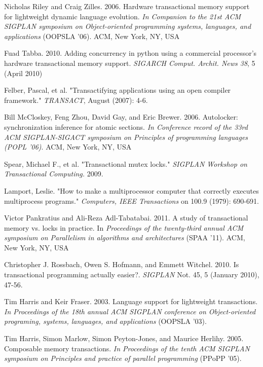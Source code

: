 \documentclass{sigplanconf}
\begin{document}
\begin{thebibliography}{}
  Nicholas Riley and Craig Zilles. 2006. Hardware transactional memory
  support for lightweight dynamic language evolution. \emph{In
    Companion to the 21st ACM SIGPLAN symposium on Object-oriented
    programming systems, languages, and applications} (OOPSLA
  '06). ACM, New York, NY, USA

  Fuad Tabba. 2010. Adding concurrency in python using a commercial
  processor's hardware transactional memory support. \emph{SIGARCH
  Comput. Archit. News 38}, 5 (April 2010)

  Felber, Pascal, et al. "Transactifying applications using an open
  compiler framework." \emph{TRANSACT}, August (2007): 4-6.

  Bill McCloskey, Feng Zhou, David Gay, and Eric
  Brewer. 2006. Autolocker: synchronization inference for atomic
  sections. \emph{In Conference record of the 33rd ACM SIGPLAN-SIGACT
  symposium on Principles of programming languages (POPL '06)}. ACM,
  New York, NY, USA

  Spear, Michael F., et al. "Transactional mutex locks." \emph{SIGPLAN
    Workshop on Transactional Computing.} 2009.

  Lamport, Leslie. "How to make a multiprocessor computer that
  correctly executes multiprocess programs." \emph{Computers, IEEE
    Transactions} on 100.9 (1979): 690-691.

  Victor Pankratius and Ali-Reza Adl-Tabatabai. 2011. A study of
  transactional memory vs. locks in practice. In \emph{Proceedings of
    the twenty-third annual ACM symposium on Parallelism in algorithms
    and architectures} (SPAA '11). ACM, New York, NY, USA

  Christopher J. Rossbach, Owen S. Hofmann, and Emmett
  Witchel. 2010. Is transactional programming actually
  easier?. \emph{SIGPLAN} Not. 45, 5 (January 2010), 47-56.

  Tim Harris and Keir Fraser. 2003. Language support for lightweight
  transactions. \emph{In Proceedings of the 18th annual ACM SIGPLAN
    conference on Object-oriented programing, systems, languages, and
    applications} (OOPSLA '03).

  Tim Harris, Simon Marlow, Simon Peyton-Jones, and Maurice
  Herlihy. 2005. Composable memory transactions. \emph{In Proceedings
    of the tenth ACM SIGPLAN symposium on Principles and practice of
    parallel programming} (PPoPP '05).


\end{thebibliography}
\end{document}

